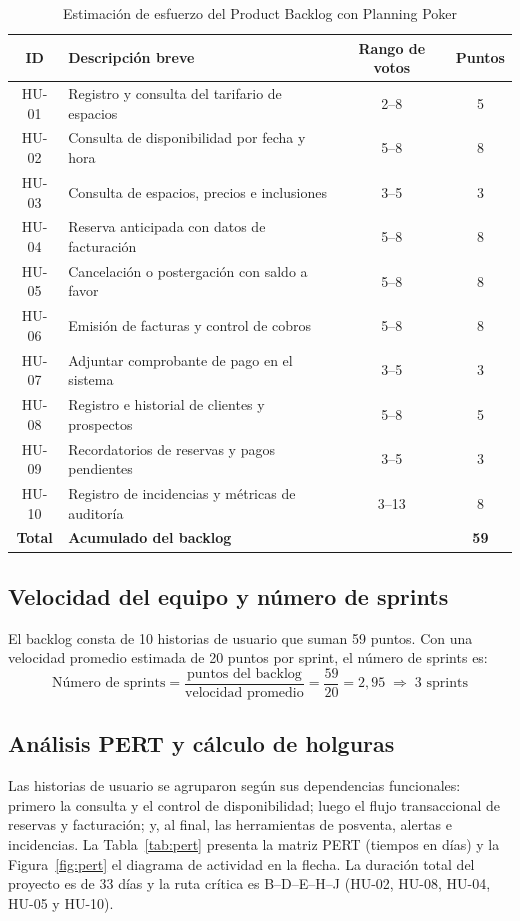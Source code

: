 \documentclass[12pt,a4paper]{article}
\begin{document}
\begin{table}[H]
\centering
\small
\caption{Estimaci\'on de esfuerzo del Product Backlog con Planning Poker}
\label{tab:estimacion}
\begin{tabular}{c p{7cm} c c}
\toprule
\textbf{ID} & \textbf{Descripci\'on breve} & \textbf{Rango de votos} & \textbf{Puntos} \\
\midrule
HU-01 & Registro y consulta del tarifario de espacios & 2--8 & 5 \\
HU-02 & Consulta de disponibilidad por fecha y hora & 5--8 & 8 \\
HU-03 & Consulta de espacios, precios e inclusiones & 3--5 & 3 \\
HU-04 & Reserva anticipada con datos de facturaci\'on & 5--8 & 8 \\
HU-05 & Cancelaci\'on o postergaci\'on con saldo a favor & 5--8 & 8 \\
HU-06 & Emisi\'on de facturas y control de cobros & 5--8 & 8 \\
HU-07 & Adjuntar comprobante de pago en el sistema & 3--5 & 3 \\
HU-08 & Registro e historial de clientes y prospectos & 5--8 & 5 \\
HU-09 & Recordatorios de reservas y pagos pendientes & 3--5 & 3 \\
HU-10 & Registro de incidencias y m\'etricas de auditor\'ia & 3--13 & 8 \\
\midrule
\textbf{Total} & \textbf{Acumulado del backlog} & & \textbf{59} \\
\bottomrule
\end{tabular}
\end{table}

\subsection{Velocidad del equipo y n\'umero de sprints}
El backlog consta de 10 historias de usuario que suman 59 puntos. Con una velocidad promedio estimada de 20 puntos por sprint, el n\'umero de sprints es:
\begin{equation}
  \text{N\'umero de sprints} = \frac{\text{puntos del backlog}}{\text{velocidad promedio}} = \frac{59}{20} = 2{,}95 \;\Rightarrow\; 3 \text{ sprints}
\end{equation}

\subsection{An\'alisis PERT y c\'alculo de holguras}
Las historias de usuario se agruparon seg\'un sus dependencias funcionales: primero la consulta y el control de disponibilidad; luego el flujo transaccional de reservas y facturaci\'on; y, al final, las herramientas de posventa, alertas e incidencias. La Tabla~\ref{tab:pert} presenta la matriz PERT (tiempos en d\'ias) y la Figura~\ref{fig:pert} el diagrama de actividad en la flecha. La duraci\'on total del proyecto es de 33 d\'ias y la ruta cr\'itica es B--D--E--H--J (HU-02, HU-08, HU-04, HU-05 y HU-10).
\end{document}
